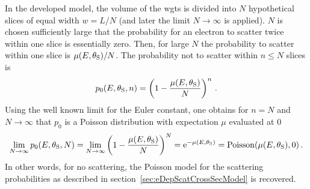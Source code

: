 In the developed model, the volume of the \gls{wgts} is divided into $N$ hypothetical slices of equal width $w=L/N$ (and later the limit $N\rightarrow\infty$ is applied). $N$ is chosen sufficiently large that the probability for an electron to scatter twice within one slice is essentially zero. Then, for large $N$ the probability to scatter within one slice is $\mu(E,\theta_\mathrm{S})/N$. The probability not to scatter within $n \leq N$ slices is
\begin{equation}
    p_0(E,\theta_\mathrm{S},n) =
    \left(
        1-\frac{\mu(E,\theta_\mathrm{S})}{N}
    \right)^n
    \text{\,.}
\end{equation}
Using the well known limit for the Euler constant, one obtains for $n=N$ and $N\rightarrow\infty$ that $p_0$ is a Poisson distribution with expectation $\mu$ evaluated at 0 
\begin{align}
    \lim_{N\rightarrow\infty} 
    p_0(E,\theta_\mathrm{S},N) =
    \lim_{N\rightarrow\infty} 
    \left(
        1-\frac{\mu(E,\theta_\mathrm{S})}{N}
    \right)^N =
    \mathrm{e}^{-\mu(E,\theta_\mathrm{S})} = 
    \mathrm{Poisson}(\mu(E,\theta_\mathrm{S}), 0)
    \text{\,.}
\end{align}
In other words, for no scattering, the Poisson model for the scattering probabilities as described in section~\ref{sec:eDepScatCrossSecModel} is recovered.

